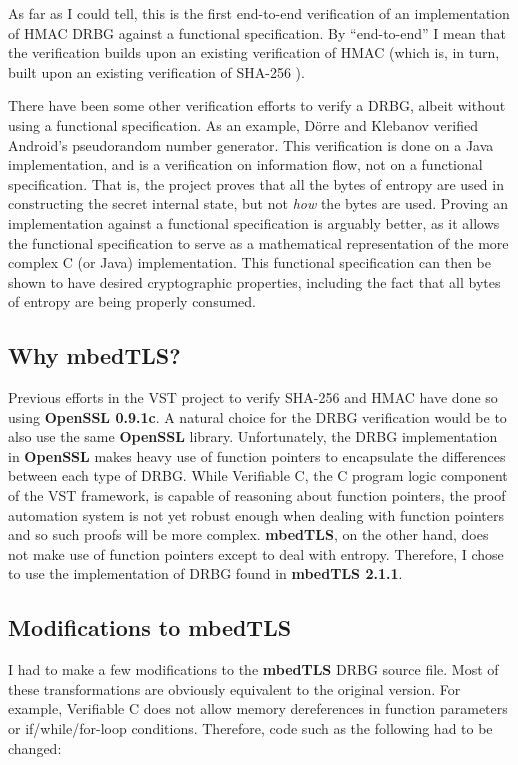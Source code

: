 \documentclass[pageno]{jpaper}
\newcommand{\stdtitle}[1]{\textbf{#1}}
\begin{document}
As far as I could tell, this is the first end-to-end verification of an implementation of HMAC DRBG against a functional specification. By “end-to-end” I mean that the verification builds upon an existing verification of HMAC \cite{hmac} (which is, in turn, built upon an existing verification of SHA-256 \cite{sha}).

There have been some other verification efforts to verify a DRBG, albeit without using a functional specification. As an example, D{\"o}rre and Klebanov \cite{prng} verified Android’s pseudorandom number generator. This verification is done on a Java implementation, and is a verification on information flow, not on a functional specification. That is, the project proves that all the bytes of entropy are used in constructing the secret internal state, but not \textit{how} the bytes are used. Proving an implementation against a functional specification is arguably better, as it allows the functional specification to serve as a mathematical representation of the more complex C (or Java) implementation. This functional specification can then be shown to have desired cryptographic properties, including the fact that all bytes of entropy are being properly consumed.


\subsection{Why mbedTLS?}

Previous efforts in the VST project to verify SHA-256 \cite{sha} and HMAC \cite{hmac} have done so using \stdtitle{OpenSSL 0.9.1c}. A natural choice for the DRBG verification would be to also use the same \stdtitle{OpenSSL} library. Unfortunately, the DRBG implementation in \stdtitle{OpenSSL} makes heavy use of function pointers to encapsulate the differences between each type of DRBG. While Verifiable C, the C program logic component of the VST framework, is capable of reasoning about function pointers, the proof automation system is not yet robust enough when dealing with function pointers and so such proofs will be more complex. \stdtitle{mbedTLS}, on the other hand, does not make use of function pointers except to deal with entropy. Therefore, I chose to use the implementation of DRBG found in \stdtitle{mbedTLS 2.1.1}.

\subsection{Modifications to mbedTLS}
I had to make a few modifications to the \stdtitle{mbedTLS} DRBG source file. Most of these transformations are obviously equivalent to the original version. For example, Verifiable C does not allow memory dereferences in function parameters or if/while/for-loop conditions. Therefore, code such as the following had to be changed:
\end{document}
